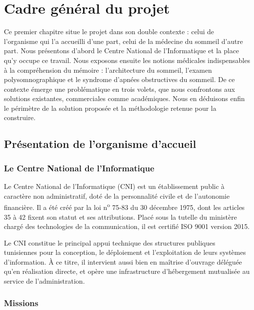 \chapter{Cadre général du projet}
\label{chap:cadre}


Ce premier chapitre situe le projet dans son double contexte : celui de l'organisme
qui l'a accueilli d'une part, celui de la médecine du sommeil d'autre part. Nous
présentons d'abord le Centre National de l'Informatique et la place qu'y occupe ce
travail. Nous exposons ensuite les notions médicales indispensables à la
compréhension du mémoire : l'architecture du sommeil, l'examen polysomnographique et
le syndrome d'apnées obstructives du sommeil. De ce contexte émerge une problématique
en trois volets, que nous confrontons aux solutions existantes, commerciales comme
académiques. Nous en déduisons enfin le périmètre de la solution proposée et la
méthodologie retenue pour la construire.

\section{Présentation de l'organisme d'accueil}

\subsection{Le Centre National de l'Informatique}

Le Centre National de l'Informatique (CNI) est un établissement public à caractère
non administratif, doté de la personnalité civile et de l'autonomie financière. Il a
été créé par la loi n\textsuperscript{o} 75-83 du 30 décembre 1975, dont les articles
35 à 42 fixent son statut et ses attributions. Placé sous la tutelle du ministère
chargé des technologies de la communication, il est certifié ISO 9001 version 2015.

Le CNI constitue le principal appui technique des structures publiques tunisiennes
pour la conception, le déploiement et l'exploitation de leurs systèmes d'information.
À ce titre, il intervient aussi bien en maîtrise d'ouvrage déléguée qu'en réalisation
directe, et opère une infrastructure d'hébergement mutualisée au service de
l'administration.

\subsection{Missions}

